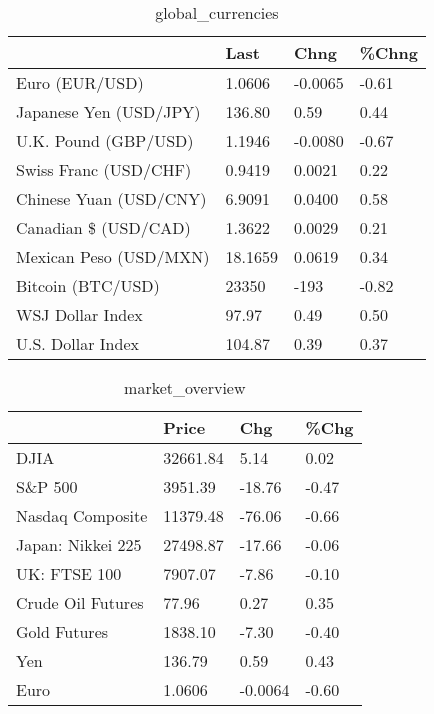 \documentclass{article}%
\begin{document}
%


\begin{table}[htbp]%
\caption{global\_currencies}%
\centering%
\begin{adjustbox}{width=1\textwidth}%
\begin{tabular}{llll}
\toprule
                       &    Last &    Chng & \%Chng \\
\midrule
        Euro (EUR/USD) &  1.0606 & -0.0065 & -0.61 \\
Japanese Yen (USD/JPY) &  136.80 &    0.59 &  0.44 \\
  U.K. Pound (GBP/USD) &  1.1946 & -0.0080 & -0.67 \\
 Swiss Franc (USD/CHF) &  0.9419 &  0.0021 &  0.22 \\
Chinese Yuan (USD/CNY) &  6.9091 &  0.0400 &  0.58 \\
  Canadian \$ (USD/CAD) &  1.3622 &  0.0029 &  0.21 \\
Mexican Peso (USD/MXN) & 18.1659 &  0.0619 &  0.34 \\
     Bitcoin (BTC/USD) &   23350 &    -193 & -0.82 \\
      WSJ Dollar Index &   97.97 &    0.49 &  0.50 \\
     U.S. Dollar Index &  104.87 &    0.39 &  0.37 \\
\bottomrule
\end{tabular}
%
\end{adjustbox}%
\end{table}

%


\begin{table}[htbp]%
\caption{market\_overview}%
\centering%
\begin{adjustbox}{width=1\textwidth}%
\begin{tabular}{llll}
\toprule
                  &    Price &     Chg &  \%Chg \\
\midrule
             DJIA & 32661.84 &    5.14 &  0.02 \\
          S\&P 500 &  3951.39 &  -18.76 & -0.47 \\
 Nasdaq Composite & 11379.48 &  -76.06 & -0.66 \\
Japan: Nikkei 225 & 27498.87 &  -17.66 & -0.06 \\
     UK: FTSE 100 &  7907.07 &   -7.86 & -0.10 \\
Crude Oil Futures &    77.96 &    0.27 &  0.35 \\
     Gold Futures &  1838.10 &   -7.30 & -0.40 \\
              Yen &   136.79 &    0.59 &  0.43 \\
             Euro &   1.0606 & -0.0064 & -0.60 \\
\bottomrule
\end{tabular}
%
\end{adjustbox}%
\end{table}

%
\end{document}
